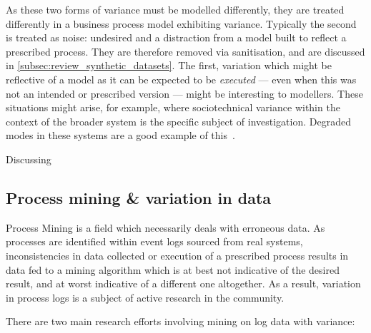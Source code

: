 As these two forms of variance must be modelled differently, they are treated
differently in a business process model exhibiting variance. Typically the
second is treated as noise: undesired and a distraction from a model built to
reflect a prescribed process. They are therefore removed via sanitisation, and
are discussed in \cref{subsec:review_synthetic_datasets}. The first, variation
which might be reflective of a model as it can be expected to be \emph{executed}
--- even when this was not an intended or prescribed version --- might be
interesting to modellers. These situations might arise, for example, where
sociotechnical variance within the context of the broader system is the specific
subject of investigation. Degraded modes in these systems are a good example of
this~\cite{johnson2007degradedmodes}.


Discussing 


\subsection{Process mining \& variation in data}




Process Mining is a field which necessarily deals with erroneous data. As
processes are identified within event logs sourced from real systems,
inconsistencies in data collected or execution of a prescribed process results
in data fed to a mining algorithm which is at best not indicative of the desired
result, and at worst indicative of a different one altogether. As a result,
variation in process logs is a subject of active research in the community.

There are two main research efforts involving mining on log data with variance:

